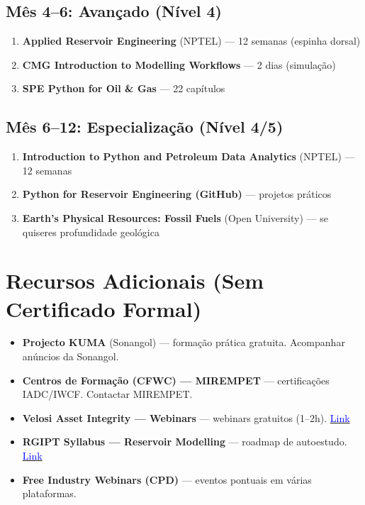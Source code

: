 \documentclass[11pt,a4paper]{article}
\newcommand{\mylink}[1]{\href{#1}{\textcolor{blue}{Link}}}
\begin{document}
\subsection*{Mês 4--6: Avançado (Nível 4)}
\begin{enumerate}[leftmargin=*]
    \item \textbf{Applied Reservoir Engineering} (NPTEL) --- 12 semanas (espinha dorsal)
    \item \textbf{CMG Introduction to Modelling Workflows} --- 2 dias (simulação)
    \item \textbf{SPE Python for Oil \& Gas} --- 22 capítulos
\end{enumerate}

\subsection*{Mês 6--12: Especialização (Nível 4/5)}
\begin{enumerate}[leftmargin=*]
    \item \textbf{Introduction to Python and Petroleum Data Analytics} (NPTEL) --- 12 semanas
    \item \textbf{Python for Reservoir Engineering (GitHub)} --- projetos práticos
    \item \textbf{Earth's Physical Resources: Fossil Fuels} (Open University) --- se quiseres profundidade geológica
\end{enumerate}

\clearpage
\section*{Recursos Adicionais (Sem Certificado Formal)}

\begin{itemize}[leftmargin=*]
    \item \textbf{Projecto KUMA} (Sonangol) --- formação prática gratuita. Acompanhar anúncios da Sonangol.
    \item \textbf{Centros de Formação (CFWC) --- MIREMPET} --- certificações IADC/IWCF. Contactar MIREMPET.
    \item \textbf{Velosi Asset Integrity --- Webinars} --- webinars gratuitos (1--2h). \mylink{https://velosiaims.com/}
    \item \textbf{RGIPT Syllabus --- Reservoir Modelling} --- roadmap de autoestudo. \mylink{https://www.rgipt.ac.in/}
    \item \textbf{Free Industry Webinars (CPD)} --- eventos pontuais em várias plataformas.
\end{itemize}
\end{document}
